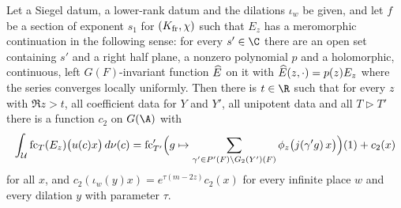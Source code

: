 \begin{proposition}\label{pf:tlift:ctsplit}
Let a Siegel datum, a lower-rank datum and the dilations $\iota_w$ be given, and let $f$ be a section of exponent $s_1$
for $(K_{\mathrm{fr}},\chi)$ such that $E_z$ has a meromorphic continuation in the following sense: for every $s'\in\C$ there are an
open set containing $s'$ and a right half plane, a nonzero polynomial $p$ and a holomorphic, continuous, left
$G(F)$-invariant function $\widehat{E}$ on it with $\widehat{E}(z,\cdot)=p(z)E_z$ where the series converges locally uniformly. Then
there is $t\in\R$ such that for every $z$ with $\Re z>t$, all coefficient data for $Y$ and $Y'$, all unipotent data
and all $T\rhd T'$ there is a function $c_2$ on $G(\A)$ with
\begin{equation}\label{eq:tlift:ctsplit}
  \int_{\mathcal U}\mathrm{fc}_T(E_z)\bigl(u(c)x\bigr)\,d\nu(c)=\mathrm{fc}'_{T'}\Bigl(g\mapsto\sum_{\gamma'\in P'(F)\backslash G_2(Y')(F)}
  \phi_z\bigl(j(\gamma'g)\,x\bigr)\Bigr)(1)+c_2(x)
\end{equation}
for all $x$, and $c_2(\iota_w(y)x)=e^{\tau(m-2z)}c_2(x)$ for every infinite place $w$ and every dilation $y$ with
parameter $\tau$.
\end{proposition}

